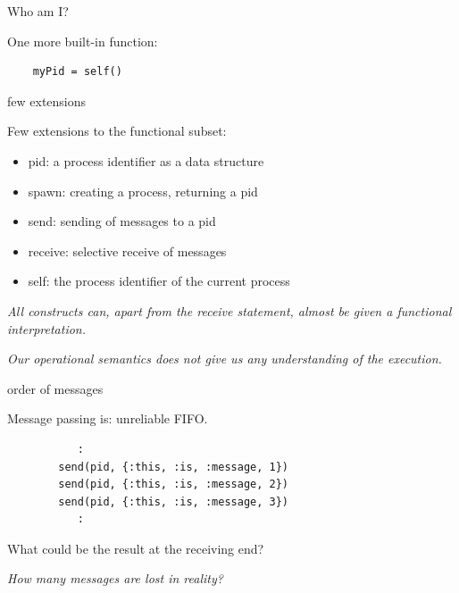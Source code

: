 \begin{frame}[fragile]{Who am I?}

One more built-in function:

\pause\vspace{10pt}

\begin{verbatim}
    myPid = self()
\end{verbatim}

\end{frame}

\begin{frame}{few extensions}

Few extensions to the functional subset:
\pause\vspace{10pt}
\begin{itemize}
\pause\item pid: a process identifier as a data structure
\pause\item spawn: creating a process, returning a pid
\pause\item send: sending of messages to a pid
\pause\item receive: selective receive of messages
\pause\item self: the process identifier of the current process
\end{itemize}

\pause\vspace{10pt}
{\em All constructs can, apart from the receive statement, almost be given a functional interpretation.}

\pause\vspace{10pt}
{\em Our operational semantics does not give us any understanding of the execution.}

\end{frame}

\begin{frame}[fragile]{order of messages}

Message passing is: unreliable FIFO.

\pause\vspace{10pt}
\begin{verbatim}
           :
        send(pid, {:this, :is, :message, 1})
        send(pid, {:this, :is, :message, 2})
        send(pid, {:this, :is, :message, 3})
           :
\end{verbatim}

\pause What could be the result at the receiving end?

\pause\vspace{10pt}
{\em How many messages are lost in reality?} 

\end{frame}

